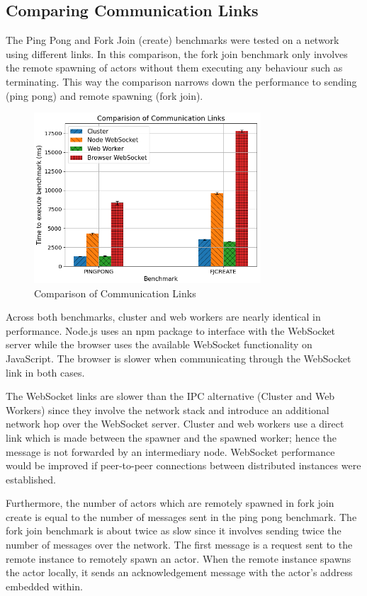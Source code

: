 \documentclass[oneside]{um-fict}
\begin{document}
\subsection{Comparing Communication Links}
The Ping Pong and Fork Join (create) benchmarks were tested on a network using different links. In this comparison, the fork join benchmark only involves the remote spawning of actors without them executing any behaviour such as terminating. This way the comparison narrows down the performance to sending (ping pong) and remote spawning (fork join).
\begin{figure}[H]
    \begin{centering}
        \includegraphics[width=320px]{resources/link.png}
        \caption{Comparison of Communication Links}
    \end{centering}
\end{figure}
Across both benchmarks, cluster and web workers are nearly identical in performance. Node.js uses an npm package to interface with the WebSocket server while the browser uses the available WebSocket functionality on JavaScript. The browser is slower when communicating through the WebSocket link in both cases. 

The WebSocket links are slower than the IPC alternative (Cluster and Web Workers) since they involve the network stack and introduce an additional network hop over the WebSocket server. Cluster and web workers use a direct link which is made between the spawner and the spawned worker; hence the message is not forwarded by an intermediary node. WebSocket performance would be improved if peer-to-peer connections between distributed instances were established.

Furthermore, the number of actors which are remotely spawned in fork join create is equal to the number of messages sent in the ping pong benchmark. The fork join benchmark is about twice as slow since it involves sending twice the number of messages over the network. The first message is a request sent to the remote instance to remotely spawn an actor. When the remote instance spawns the actor locally, it sends an acknowledgement message with the actor's address embedded within.
\end{document}
